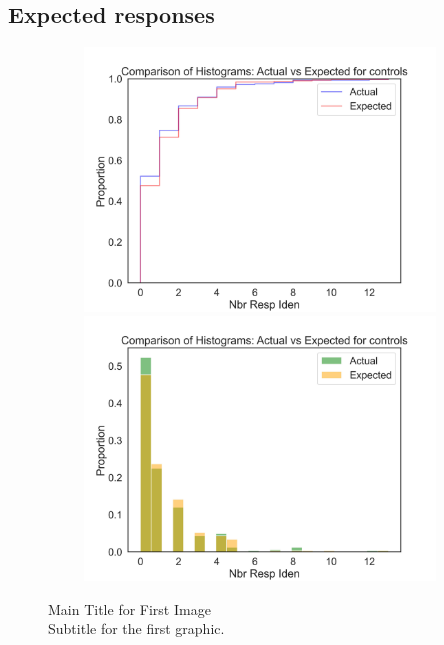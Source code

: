 \subsection{Expected responses} 
\begin{figure}[H]
    \centering
    \includegraphics[width=12cm,height=7cm]{MainLayout/Images/chapter9/actual_expected_controls_ecdf.jpg}
    \includegraphics[width=12cm,height=7cm]{MainLayout/Images/chapter9/actual_expected_controls_hist.jpg}
    \caption{Main Title for First Image \\ \small Subtitle for the first graphic.}
    \label{fig:kernel_comparison_methods}
\end{figure}


